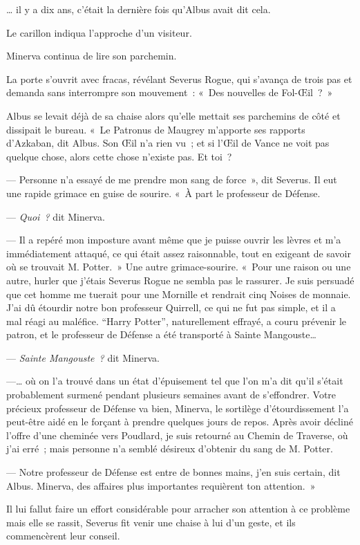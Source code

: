 … il y a dix ans, c'était la dernière fois qu'Albus avait dit cela.

Le carillon indiqua l'approche d'un visiteur.

Minerva continua de lire son parchemin.

La porte s'ouvrit avec fracas, révélant Severus Rogue, qui s'avança de trois pas et demanda sans interrompre son mouvement~: «~Des nouvelles de Fol-Œil~?~»

Albus se levait déjà de sa chaise alors qu'elle mettait ses parchemins de côté et dissipait le bureau. «~Le Patronus de Maugrey m'apporte ses rapports d'Azkaban, dit Albus. Son Œil n'a rien vu~; et si l'Œil de Vance ne voit pas quelque chose, alors cette chose n'existe pas. Et toi~?

--- Personne n'a essayé de me prendre mon sang de force~», dit Severus. Il eut une rapide grimace en guise de sourire. «~À part le professeur de Défense.

--- \emph{Quoi~?} dit Minerva.

--- Il a repéré mon imposture avant même que je puisse ouvrir les lèvres et m'a immédiatement attaqué, ce qui était assez raisonnable, tout en exigeant de savoir où se trouvait M. Potter.~» Une autre grimace-sourire. «~Pour une raison ou une autre, hurler que j'étais Severus Rogue ne sembla pas le rassurer. Je suis persuadé que cet homme me tuerait pour une Mornille et rendrait cinq Noises de monnaie. J'ai dû étourdir notre bon professeur Quirrell, ce qui ne fut pas simple, et il a mal réagi au maléfice. “Harry Potter”, naturellement effrayé, a couru prévenir le patron, et le professeur de Défense a été transporté à Sainte Mangouste…

--- \emph{Sainte Mangouste~?} dit Minerva.

---… où on l'a trouvé dans un état d'épuisement tel que l'on m'a dit qu'il s'était probablement surmené pendant plusieurs semaines avant de s'effondrer. Votre précieux professeur de Défense va bien, Minerva, le sortilège d'étourdissement l'a peut-être aidé en le forçant à prendre quelques jours de repos. Après avoir décliné l'offre d'une cheminée vers Poudlard, je suis retourné au Chemin de Traverse, où j'ai erré~; mais personne n'a semblé désireux d'obtenir du sang de M. Potter.

--- Notre professeur de Défense est entre de bonnes mains, j'en suis certain, dit Albus. Minerva, des affaires plus importantes requièrent ton attention.~»

Il lui fallut faire un effort considérable pour arracher son attention à ce problème mais elle se rassit, Severus fit venir une chaise à lui d'un geste, et ils commencèrent leur conseil.

